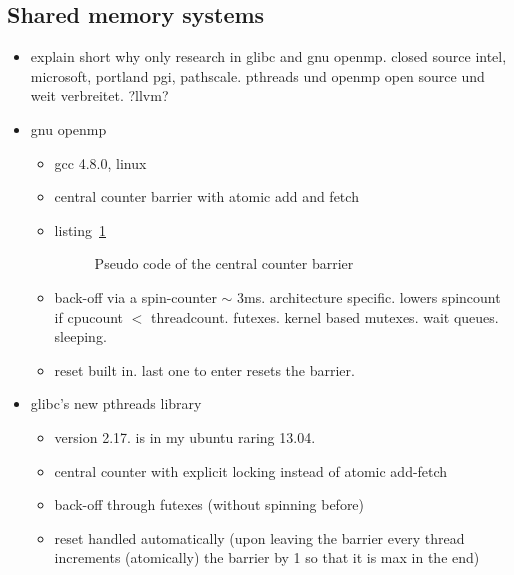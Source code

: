 \documentclass[a4paper, 10pt]{article}
\begin{document}
\subsection{Shared memory systems}
\begin{itemize}
	\item explain short why only research in glibc and gnu openmp\cite{openmp}. closed source intel, microsoft, portland pgi, pathscale. pthreads und openmp open source und weit verbreitet. ?llvm?
	\item gnu openmp\cite{gomp}
		\begin{itemize}
			\item gcc 4.8.0, linux
			\item central counter barrier with atomic add and fetch
			\item listing~\ref{listing:central-counter-no-reset}
				\begin{figure}[htbp]
					\centering
					
					\caption{Pseudo code of the central counter barrier}
					\label{listing:central-counter-no-reset}
				\end{figure}

			\item back-off via a spin-counter $\sim$ 3ms. architecture specific. lowers spincount if cpucount $<$ threadcount. futexes\cite{franke2002}. kernel based mutexes. wait queues. sleeping.
			\item reset built in. last one to enter resets the barrier.
		\end{itemize}
	\item glibc's\cite{glibc} new pthreads library
		\begin{itemize}
			\item version 2.17. is in my ubuntu raring 13.04.
			\item central counter with explicit locking instead of atomic add-fetch
			\item back-off through futexes (without spinning before)
			\item reset handled automatically (upon leaving the barrier every thread increments (atomically) the barrier by 1 so that it is max in the end)
		\end{itemize}
\end{itemize}
\end{document}
